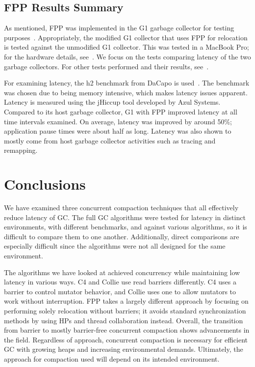 \documentclass{sig-alternate}
\begin{document}
\subsection{FPP Results Summary}
\label{sec:fppResults}


As mentioned, FPP was implemented in the G1 garbage collector for testing purposes~\cite{Osterlund:FPP}. 
Appropriately, the modified G1 collector that uses FPP for relocation is tested against the
unmodified G1 collector. This was tested in a MacBook Pro; for the 
hardware details, see~\cite{Osterlund:FPP}. We focus on the tests comparing
latency of the two garbage collectors. For other tests performed and their results, see~\cite{Osterlund:FPP}.

For examining latency, the h2 benchmark from DaCapo is used~\cite{Blackburn:DaCapo}.
The benchmark was chosen due to being memory intensive,
which makes latency issues apparent.
Latency is measured using the jHiccup tool developed by Azul Systems.
Compared to its host garbage collector, G1 with FPP improved latency at all time
intervals examined. On average, latency was improved by around 50\%; application
pause times were about half as long. Latency was also shown to mostly come from
host garbage collector activities such as tracing and remapping.


\section{Conclusions}
\label{sec:conclusions}

We have examined three concurrent compaction techniques that all 
effectively reduce latency of GC.
The full GC algorithms were tested for latency in
distinct environments, with different benchmarks, and against various algorithms, so it is difficult to 
compare them to one another. Additionally, direct comparisons are especially difficult since the
algorithms were not all designed for the same environment.

The algorithms we have looked at achieved concurrency while maintaining low latency in various
ways. C4 and Collie use read barriers differently. C4 
uses a barrier to control mutator behavior, and Collie uses one to allow mutators to
work without interruption. FPP takes a largely different approach by focusing on 
performing solely relocation without barriers; it avoids standard synchronization methods by using HPs
and thread collaboration instead. Overall, the transition from barrier 
to mostly barrier-free concurrent compaction
shows advancements in the field.
Regardless of approach, concurrent compaction is necessary for efficient GC with growing heaps and
increasing environmental demands. Ultimately,
the approach for compaction used will depend on its intended environment.
\end{document}
